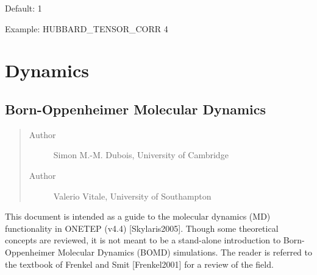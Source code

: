 \documentclass[letterpaper,10pt,english]{sphinxmanual}
\begin{document}
Default: 1

Example: HUBBARD\_TENSOR\_CORR 4


\chapter{Dynamics}
\label{\detokenize{index_dynamics:dynamics}}\label{\detokenize{index_dynamics::doc}}

\section{Born-Oppenheimer Molecular Dynamics}
\label{\detokenize{BOMD::doc}}\label{\detokenize{BOMD:born-oppenheimer-molecular-dynamics}}\begin{quote}\begin{description}
\item[{Author}] \leavevmode
Simon M.-M. Dubois, University of Cambridge

\item[{Author}] \leavevmode
Valerio Vitale, University of Southampton

\end{description}\end{quote}

This document is intended as a guide to the molecular dynamics (MD)
functionality in ONETEP (v4.4) {[}Skylaris2005{]}. Though
some theoretical concepts are reviewed, it is not meant to be a
stand-alone introduction to Born-Oppenheimer Molecular Dynamics (BOMD)
simulations. The reader is referred to the textbook of Frenkel and
Smit {[}Frenkel2001{]} for a review of the field.
\end{document}
